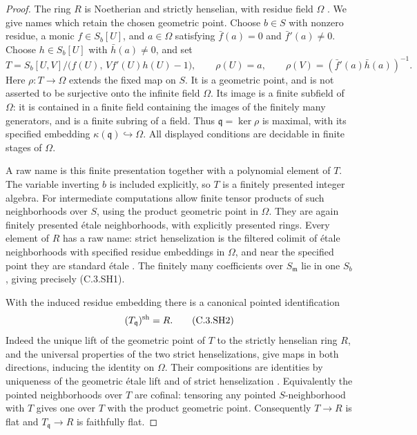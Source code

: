 \begin{proof}
The ring $R$ is Noetherian and strictly henselian, with
residue field $\Omega$
\cite[Section 10.155, Lemma 10.155.2; Tag 06LJ,
Lemma 15.46.3]{C-StacksStrictEffective}.
We give names which retain the chosen geometric point.
Choose $b\in S$ with nonzero residue, a monic
$f\in S_b[U]$, and $a\in\Omega$ satisfying
$\bar f(a)=0$ and $\bar f'(a)\ne0$.
Choose $h\in S_b[U]$ with $\bar h(a)\ne0$, and set
\[
 T=S_b[U,V]/\bigl(f(U),\,Vf'(U)h(U)-1\bigr),
 \qquad \rho(U)=a,\qquad
 \rho(V)=(\bar f'(a)\bar h(a))^{-1}.                    \tag{C.3.SH1}
\]
Here $\rho:T\to\Omega$ extends the fixed map on $S$.
It is a geometric point, and is not asserted to be
surjective onto the infinite field $\Omega$.
Its image is a finite subfield of $\Omega$: it is
contained in a finite field containing the images
of the finitely many generators, and is a finite
subring of a field.  Thus
$\mathfrak q=\ker\rho$ is maximal, with its specified
embedding $\kappa(\mathfrak q)\hookrightarrow\Omega$.
All displayed conditions are decidable in finite
stages of $\Omega$.

A raw name is this finite presentation together
with a polynomial element of $T$.
The variable inverting $b$ is included explicitly,
so $T$ is a finitely presented integer algebra.
For intermediate computations allow finite tensor
products of such neighborhoods over $S$, using the
product geometric point in $\Omega$.
They are again finitely presented \'etale
neighborhoods, with explicitly presented rings.
Every element of $R$ has a raw name: strict
henselization is the filtered colimit of \'etale
neighborhoods with specified residue embeddings
in $\Omega$, and near the specified point they
are standard \'etale
\cite[Lemmas 10.155.2 and 10.155.11; Tag 00UE,
Proposition 10.144.4]{C-StacksStrictEffective}.
The finitely many coefficients over $S_{\mathfrak m}$
lie in one $S_b$, giving precisely (C.3.SH1).

With the induced residue embedding there is a
canonical pointed identification
\[
                      (T_{\mathfrak q})^{\rm sh}=R.       \tag{C.3.SH2}
\]
Indeed the unique lift of the geometric point of
$T$ to the strictly henselian ring $R$, and the
universal properties of the two strict henselizations,
give maps in both directions, inducing the identity
on $\Omega$.  Their compositions are identities by
uniqueness of the geometric \'etale lift and of
strict henselization
\cite[Lemmas 10.155.9--10.155.11]{C-StacksStrictEffective}.
Equivalently the pointed neighborhoods over $T$
are cofinal: tensoring any pointed $S$-neighborhood
with $T$ gives one over $T$ with the product
geometric point.  Consequently $T\to R$ is flat
and $T_{\mathfrak q}\to R$ is faithfully flat.


\end{proof}

